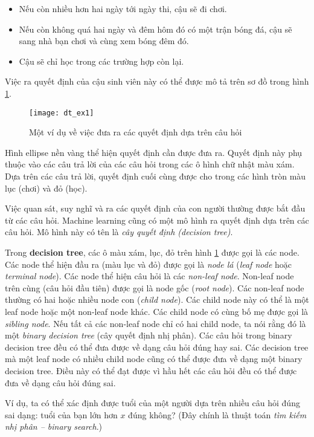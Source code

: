 \documentclass[../main-report.tex]{subfiles}
\begin{document}
\begin{itemize}
\item Nếu còn nhiều hơn hai ngày tới ngày thi, cậu sẽ đi chơi.
\item Nếu còn không quá hai ngày và đêm hôm đó có một trận bóng đá, cậu sẽ sang nhà bạn chơi và cùng xem bóng đêm đó.
\item Cậu sẽ chỉ học trong các trường hợp còn lại.
\end{itemize}

Việc ra quyết định của cậu sinh viên này có thể được mô tả trên sơ đồ trong hình \ref{fig:dt_ex1}.

\begin{figure}[ht!]
\centering\texttt{[image: dt\_ex1]}
\caption{Một ví dụ về việc đưa ra các quyết định dựa trên câu hỏi}
\label{fig:dt_ex1}
\end{figure}

Hình ellipse nền vàng thể hiện quyết định cần được đưa ra. Quyết định này phụ thuộc vào các câu trả lời của các câu hỏi trong các ô hình chữ nhật màu xám. Dựa trên các câu trả lời, quyết định cuối cùng được cho trong các hình tròn màu lục (chơi) và đỏ (học).

Việc quan sát, suy nghĩ và ra các quyết định của con người thường được bắt đầu từ các câu hỏi. Machine learning cũng có một mô hình ra quyết định dựa trên các câu hỏi. Mô hình này có tên là \textit{cây quyết định (decision tree)}.

Trong \textbf{decision tree}, các ô màu xám, lục, đỏ trên hình \ref{fig:dt_ex1} được gọi là các node. Các node thể hiện đầu ra (màu lục và đỏ) được gọi là \textit{node lá} (\textit{leaf node} hoặc \textit{terminal node}). Các node thể hiện câu hỏi là các \textit{non-leaf node}. Non-leaf node trên cùng (câu hỏi đầu tiên) được gọi là node gốc (\textit{root node}). Các non-leaf node thường có hai hoặc nhiều node con (\textit{child node}). Các child node này có thể là một leaf node hoặc một non-leaf node khác. Các child node có cùng bố mẹ được gọi là \textit{sibling node}. Nếu tất cả các non-leaf node chỉ có hai child node, ta nói rằng đó là một \textit{binary decision tree} (cây quyết định nhị phân). Các câu hỏi trong binary decision tree đều có thể đưa được về dạng câu hỏi đúng hay sai. Các decision tree mà một leaf node có nhiều child node cũng có thể được đưa về dạng một binary decision tree. Điều này có thể đạt được vì hầu hết các câu hỏi đều có thể được đưa về dạng câu hỏi đúng sai.

Ví dụ, ta có thể xác định được tuổi của một người dựa trên nhiều câu hỏi đúng sai dạng: tuổi của bạn lớn hơn $x$ đúng không? (Đây chính là thuật toán \textit{tìm kiếm nhị phân – binary search}.)
\end{document}
